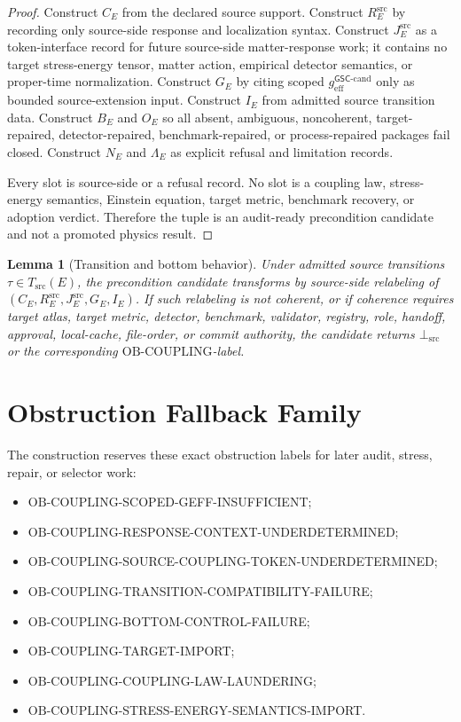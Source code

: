 \documentclass[11pt]{article}
\newcommand{\geffCand}{g_{\mathrm{eff}}^{\mathsf{GSC}\mbox{-}\mathrm{cand}}}
\newcommand{\BottomSrc}{\bot_{\mathrm{src}}}
\newcommand{\OB}{\mathrm{OB}\mbox{-}\mathrm{COUPLING}}
\newtheorem{lemma}{Lemma}
\begin{document}
\begin{proof}
Construct \(C_E\) from the declared source support. Construct
\(R^{\mathrm{src}}_E\) by recording only source-side response and localization
syntax. Construct \(J^{\mathrm{src}}_E\) as a token-interface record for future
source-side matter-response work; it contains no target stress-energy tensor,
matter action, empirical detector semantics, or proper-time normalization.
Construct \(G_E\) by citing scoped \(\geffCand\) only as bounded
source-extension input. Construct \(I_E\) from admitted source transition data.
Construct \(B_E\) and \(O_E\) so all absent, ambiguous, noncoherent,
target-repaired, detector-repaired, benchmark-repaired, or process-repaired
packages fail closed. Construct \(N_E\) and \(\Lambda_E\) as explicit refusal
and limitation records.

Every slot is source-side or a refusal record. No slot is a coupling law,
stress-energy semantics, Einstein equation, target metric, benchmark recovery,
or adoption verdict. Therefore the tuple is an audit-ready precondition
candidate and not a promoted physics result.
\end{proof}

\begin{lemma}[Transition and bottom behavior]
Under admitted source transitions \(\tau\in T_{\mathrm{src}}(E)\), the
precondition candidate transforms by source-side relabeling of
\((C_E,R^{\mathrm{src}}_E,J^{\mathrm{src}}_E,G_E,I_E)\). If such relabeling is
not coherent, or if coherence requires target atlas, target metric, detector,
benchmark, validator, registry, role, handoff, approval, local-cache,
file-order, or commit authority, the candidate returns \(\BottomSrc\) or the
corresponding \(\OB\)-label.
\end{lemma}

\section{Obstruction Fallback Family}

The construction reserves these exact obstruction labels for later audit,
stress, repair, or selector work:

\begin{itemize}[leftmargin=*]
  \item \(\OB\)-SCOPED-GEFF-INSUFFICIENT;
  \item \(\OB\)-RESPONSE-CONTEXT-UNDERDETERMINED;
  \item \(\OB\)-SOURCE-COUPLING-TOKEN-UNDERDETERMINED;
  \item \(\OB\)-TRANSITION-COMPATIBILITY-FAILURE;
  \item \(\OB\)-BOTTOM-CONTROL-FAILURE;
  \item \(\OB\)-TARGET-IMPORT;
  \item \(\OB\)-COUPLING-LAW-LAUNDERING;
  \item \(\OB\)-STRESS-ENERGY-SEMANTICS-IMPORT.
\end{itemize}
\end{document}
